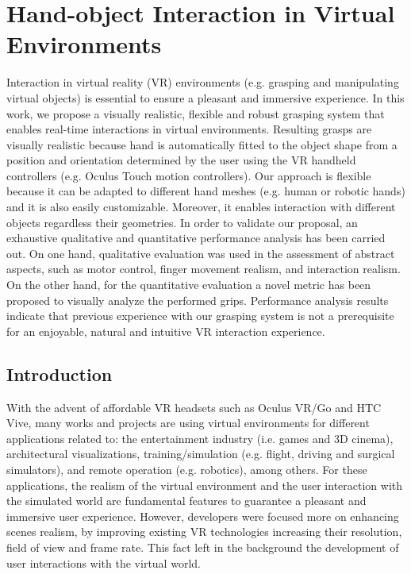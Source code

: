 \chapter{Hand-object Interaction in Virtual Environments}
\label{cha:unrealgrasp}

\begin{chapterabstract}
Interaction in virtual reality (VR) environments (e.g. grasping and manipulating virtual objects) is essential to ensure a pleasant and immersive experience. In this work, we propose a visually realistic, flexible and robust grasping system that enables real-time interactions in virtual environments. Resulting grasps are visually realistic because hand is automatically fitted to the object shape from a position and orientation determined by the user using the VR handheld controllers (e.g. Oculus Touch motion controllers). Our approach is flexible because it can be adapted to different hand meshes (e.g. human or robotic hands) and it is also easily customizable. Moreover, it enables interaction with different objects regardless their geometries. In order to validate our proposal, an exhaustive qualitative and quantitative performance analysis has been carried out. On one hand, qualitative evaluation was used in the assessment of abstract aspects, such as motor control, finger movement realism, and interaction realism. On the other hand, for the quantitative evaluation a novel metric has been proposed to visually analyze the performed grips. Performance analysis results indicate that previous experience with our grasping system is not a prerequisite for an enjoyable, natural and intuitive VR interaction experience.
\end{chapterabstract}

\minitoc

\clearpage

\section{Introduction}
\label{sec:introduction}

With the advent of affordable VR headsets such as Oculus VR/Go and HTC Vive, many works and projects are using virtual environments for different applications related to: the entertainment industry (i.e. games and 3D cinema), architectural visualizations, training/simulation (e.g. flight, driving and surgical simulators), and remote operation (e.g. robotics), among others. For these applications, the realism of the virtual environment and the user interaction with the simulated world are fundamental features to guarantee a pleasant and immersive user experience. However, developers were focused more on enhancing scenes realism, by improving existing VR technologies increasing their resolution, field of view and frame rate. This fact left in the background the development of user interactions with the virtual world. 


